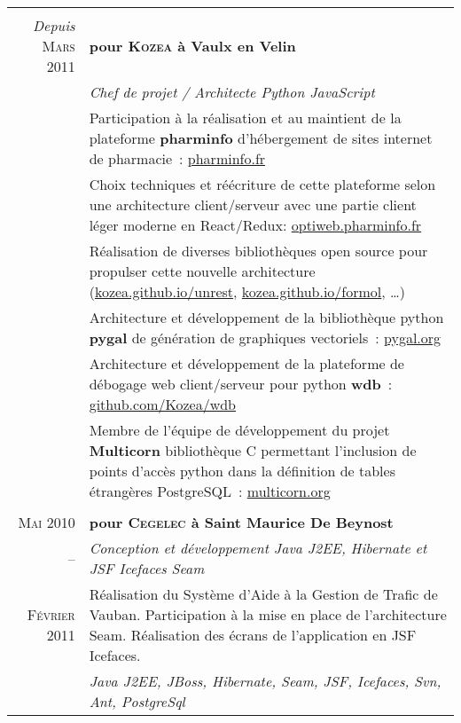 \documentclass[a4paper,10pt]{article}
\begin{document}
\begin{supertabular}{r|p{11cm}}
   \\
  \emph{Depuis} \textsc{Mars} 2011  & \textbf{pour \textsc{Kozea} à Vaulx en Velin} \\
  & \emph{Chef de projet / Architecte Python JavaScript} \\
  & \footnotesize{Participation à la réalisation et au maintient de la plateforme \textbf{pharminfo} d’hébergement de sites internet de pharmacie : \href{https://www.pharminfo.fr}{pharminfo.fr}} \\
  & \footnotesize{Choix techniques et réécriture de cette plateforme selon une architecture client/serveur avec une partie client léger moderne en React/Redux: \href{https://optiweb.pharminfo.fr}{optiweb.pharminfo.fr}} \\
  & \footnotesize{Réalisation de diverses bibliothèques open source pour propulser cette nouvelle architecture (\href{https://kozea.github.io/unrest/}{kozea.github.io/unrest}, \href{https://kozea.github.io/formol/}{kozea.github.io/formol}, …)} \\
  & \footnotesize{Architecture et développement de la bibliothèque python \textbf{pygal} de génération de graphiques vectoriels : \href{http://www.pygal.org/en/stable/}{pygal.org}} \\
  & \footnotesize{Architecture et développement de la plateforme de débogage web client/serveur pour python \textbf{wdb} : \href{https://github.com/Kozea/wdb}{github.com/Kozea/wdb}} \\
  & \footnotesize{Membre de l’équipe de développement du projet \textbf{Multicorn} bibliothèque C permettant l’inclusion de points d'accès python dans la définition de tables étrangères PostgreSQL : \href{https://multicorn.org/}{multicorn.org}} \\


   \\
  \textsc{Mai} 2010  & \textbf{pour \textsc{Cegelec} à Saint Maurice De Beynost} \\
  -- & \emph{Conception et développement Java J2EE, Hibernate et JSF Icefaces Seam} \\
  \footnotesize{\textsc{Février} 2011} & \footnotesize{Réalisation du Système d’Aide à la Gestion de Trafic de Vauban. Participation à la mise en place de l’architecture Seam. Réalisation des écrans de l’application en JSF Icefaces.} \\
  & \emph{Java J2EE, JBoss, Hibernate, Seam, JSF, Icefaces, Svn, Ant, PostgreSql} \\



\end{supertabular}
\end{document}
